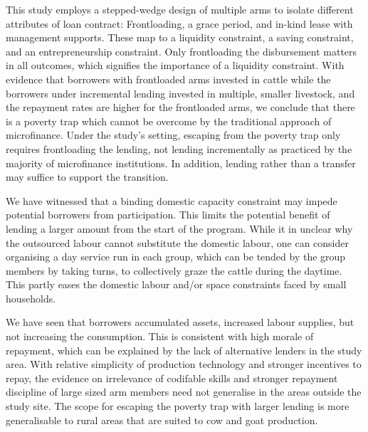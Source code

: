 		This study employs a stepped-wedge design of multiple arms to isolate different attributes of loan contract: Frontloading, a grace period, and in-kind lease with management supports. These map to a liquidity constraint, a saving constraint, and an entrepreneurship constraint. Only frontloading the disbursement matters in all outcomes, which signifies the importance of a liquidity constraint. With evidence that borrowers with frontloaded arms invested in cattle while the borrowers under incremental lending invested in multiple, smaller livestock, and the repayment rates are higher for the frontloaded arms, we conclude that there is a poverty trap which cannot be overcome by the traditional approach of microfinance. Under the study's setting, escaping from the poverty trap only requires frontloading the lending, not lending incrementally as practiced by the majority of microfinance institutions. In addition, lending rather than a transfer may suffice to support the transition. 
		
		We have witnessed that a binding domestic capacity constraint may impede potential borrowers from participation. This limits the potential benefit of lending a larger amount from the start of the program. While it in unclear why the outsourced labour cannot substitute the domestic labour, one can consider organising a day service run in each group, which can be tended by the group members by taking turns, to collectively graze the cattle during the daytime. This partly eases the domestic labour and/or space constraints faced by small households. 

		We have seen that borrowers accumulated assets, increased labour supplies, but not increasing the consumption. This is consistent with high morale of repayment, which can be explained by the lack of alternative lenders in the study area. With relative simplicity of production technology and stronger incentives to repay, the evidence on irrelevance of codifable skills and stronger repayment discipline of large sized arm members need not generalise in the areas outside the study site. The scope for escaping the poverty trap with larger lending is more generalisable to rural areas that are suited to cow and goat production. 



{\footnotesize
\setlength{\baselineskip}{8pt}

}

\appendix
\setcounter{section}{0}
\setcounter{figure}{0}
\setcounter{table}{0}
\renewcommand{\thefigure}{\Alph{section}\arabic{figure}}
\renewcommand{\thetable}{\Alph{section}\arabic{table}}
\renewcommand{\thesection}{\Alph{section}}



